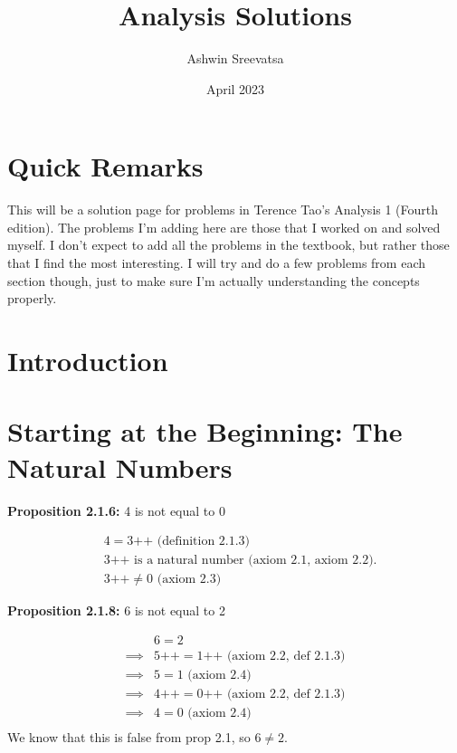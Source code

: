 \documentclass[answers,12pt]{exam}
\title{Analysis Solutions}
\author{Ashwin Sreevatsa}
\date{April 2023}
\newcommand{\increment}{\text{++}}
\begin{document}
\maketitle

\section*{Quick Remarks}
This will be a solution page for problems in Terence Tao's Analysis 1 (Fourth edition).
The problems I'm adding here are those that I worked on and solved myself.
I don't expect to add all the problems in the textbook, but rather those that I find the most interesting.
I will try and do a few problems from each section though, just to make sure I'm actually understanding the concepts properly.

\section{Introduction}

\section{Starting at the Beginning: The Natural Numbers}

\textbf{Proposition 2.1.6:} 4 is not equal to 0 

\begin{solution}
    \[
        \begin{aligned} 
            &4 = 3\increment \text{ (definition 2.1.3)} \\
            &3\increment \text{ is a natural number (axiom 2.1, axiom 2.2).} \\
            &3\increment \neq 0 \text{ (axiom 2.3)}
        \end{aligned}
    \]
\end{solution}

\textbf{Proposition 2.1.8:} 6 is not equal to 2
\begin{solution}
    \[
        \begin{aligned}
            &6=2\\
            \implies &5 \increment = 1 \increment \text{ (axiom 2.2, def 2.1.3)}\\
            \implies &5 = 1 \text{ (axiom 2.4)}\\
            \implies &4 \increment = 0 \increment \text{ (axiom 2.2, def 2.1.3)}\\
            \implies &4 = 0 \text{ (axiom 2.4)}\\
        \end{aligned}
    \]
    We know that this is false from prop 2.1, so $6 \neq 2$.
\end{solution}
\end{document}
